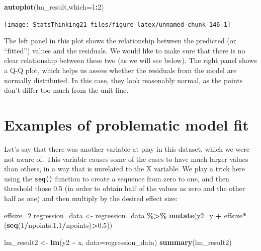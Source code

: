 \documentclass[
  12pt,
]{book}
\newenvironment{Shaded}{\begin{snugshade}}{\end{snugshade}}
\newcommand{\AttributeTok}[1]{\textcolor[rgb]{0.13,0.29,0.53}{#1}}
\newcommand{\DecValTok}[1]{\textcolor[rgb]{0.00,0.00,0.81}{#1}}
\newcommand{\FloatTok}[1]{\textcolor[rgb]{0.00,0.00,0.81}{#1}}
\newcommand{\FunctionTok}[1]{\textcolor[rgb]{0.13,0.29,0.53}{\textbf{#1}}}
\newcommand{\NormalTok}[1]{#1}
\newcommand{\OtherTok}[1]{\textcolor[rgb]{0.56,0.35,0.01}{#1}}
\newcommand{\SpecialCharTok}[1]{\textcolor[rgb]{0.81,0.36,0.00}{\textbf{#1}}}
\begin{document}
\begin{Shaded}
\begin{Highlighting}[]
\FunctionTok{autoplot}\NormalTok{(lm\_result,}\AttributeTok{which=}\DecValTok{1}\SpecialCharTok{:}\DecValTok{2}\NormalTok{)}
\end{Highlighting}
\end{Shaded}

\texttt{[image: StatsThinking21\_files/figure-latex/unnamed-chunk-146-1]}

The left panel in this plot shows the relationship between the predicted (or ``fitted'') values and the residuals. We would like to make sure that there is no clear relationship between these two (as we will see below). The right panel shows a Q-Q plot, which helps us assess whether the residuals from the model are normally distributed. In this case, they look reasonably normal, as the points don't differ too much from the unit line.

\hypertarget{examples-of-problematic-model-fit}{%
\section{Examples of problematic model fit}\label{examples-of-problematic-model-fit}}

Let's say that there was another variable at play in this dataset, which we were not aware of. This variable causes some of the cases to have much larger values than others, in a way that is unrelated to the X variable. We play a trick here using the \texttt{seq()} function to create a sequence from zero to one, and then threshold those 0.5 (in order to obtain half of the values as zero and the other half as one) and then multiply by the desired effect size:

\begin{Shaded}
\begin{Highlighting}[]
\NormalTok{effsize}\OtherTok{=}\DecValTok{2}
\NormalTok{regression\_data }\OtherTok{\textless{}{-}}\NormalTok{ regression\_data }\SpecialCharTok{\%\textgreater{}\%}
  \FunctionTok{mutate}\NormalTok{(}\AttributeTok{y2=}\NormalTok{y }\SpecialCharTok{+}\NormalTok{ effsize}\SpecialCharTok{*}\NormalTok{(}\FunctionTok{seq}\NormalTok{(}\DecValTok{1}\SpecialCharTok{/}\NormalTok{npoints,}\DecValTok{1}\NormalTok{,}\DecValTok{1}\SpecialCharTok{/}\NormalTok{npoints)}\SpecialCharTok{\textgreater{}}\FloatTok{0.5}\NormalTok{))}

\NormalTok{lm\_result2 }\OtherTok{\textless{}{-}} \FunctionTok{lm}\NormalTok{(y2 }\SpecialCharTok{\textasciitilde{}}\NormalTok{ x, }\AttributeTok{data=}\NormalTok{regression\_data)}
\FunctionTok{summary}\NormalTok{(lm\_result2)}
\end{Highlighting}
\end{Shaded}
\end{document}
